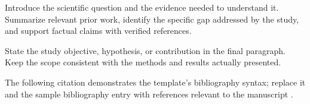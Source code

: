 Introduce the scientific question and the evidence needed to understand it. Summarize relevant prior work, identify the specific gap addressed by the study, and support factual claims with verified references.

State the study objective, hypothesis, or contribution in the final paragraph. Keep the scope consistent with the methods and results actually presented.

The following citation demonstrates the template's bibliography syntax; replace it and the sample bibliography entry with references relevant to the manuscript \citep{wilkinson2016fair}.

